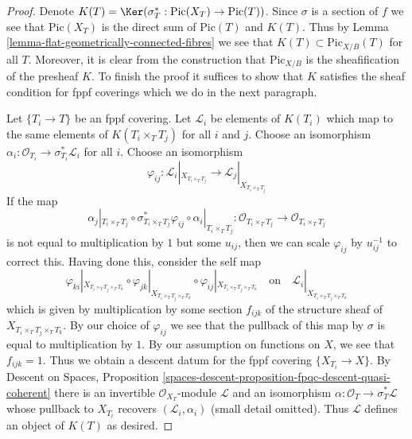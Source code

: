 \begin{proof}
Denote $K(T) = \Ker(\sigma_T^* : \text{Pic}(X_T) \to \text{Pic}(T))$.
Since $\sigma$ is a section of $f$ we see that $\text{Pic}(X_T)$ is the direct
sum of $\text{Pic}(T)$ and $K(T)$.
Thus by Lemma \ref{lemma-flat-geometrically-connected-fibres} we see that
$K(T) \subset \text{Pic}_{X/B}(T)$ for all $T$. Moreover, it is clear
from the construction that $\text{Pic}_{X/B}$ is the sheafification
of the presheaf $K$. To finish the proof it suffices to show that
$K$ satisfies the sheaf condition for fppf coverings which we do
in the next paragraph.

\medskip\noindent
Let $\{T_i \to T\}$ be an fppf covering. Let $\mathcal{L}_i$ be
elements of $K(T_i)$ which map to the same elements of $K(T_i \times_T T_j)$
for all $i$ and $j$. Choose an isomorphism
$\alpha_i : \mathcal{O}_{T_i} \to \sigma_{T_i}^*\mathcal{L}_i$
for all $i$. Choose an isomorphism
$$
\varphi_{ij} :
\mathcal{L}_i|_{X_{T_i \times_T T_j}}
\longrightarrow
\mathcal{L}_j|_{X_{T_i \times_T T_j}}
$$
If the map
$$
\alpha_j|_{T_i \times_T T_j} \circ
\sigma_{T_i \times_T T_j}^*\varphi_{ij} \circ
\alpha_i|_{T_i \times_T T_j} :
\mathcal{O}_{T_i \times_T T_j} \to \mathcal{O}_{T_i \times_T T_j}
$$
is not equal to multiplication by $1$ but some $u_{ij}$, then we can scale
$\varphi_{ij}$ by $u_{ij}^{-1}$ to correct this. Having done this, consider
the self map
$$
\varphi_{ki}|_{X_{T_i \times_T T_j \times_T T_k}} \circ
\varphi_{jk}|_{X_{T_i \times_T T_j \times_T T_k}} \circ
\varphi_{ij}|_{X_{T_i \times_T T_j \times_T T_k}}
\quad\text{on}\quad
\mathcal{L}_i|_{X_{T_i \times_T T_j \times_T T_k}}
$$
which is given by multiplication by some section $f_{ijk}$
of the structure sheaf of $X_{T_i \times_T T_j \times_T T_k}$.
By our choice of $\varphi_{ij}$ we see that the pullback of
this map by $\sigma$ is equal to multiplication by $1$. By
our assumption on functions on $X$, we see that $f_{ijk} = 1$.
Thus we obtain a descent datum for the fppf covering
$\{X_{T_i} \to X\}$. By
Descent on Spaces, Proposition
\ref{spaces-descent-proposition-fpqc-descent-quasi-coherent}
there is an invertible $\mathcal{O}_{X_T}$-module $\mathcal{L}$
and an isomorphism $\alpha : \mathcal{O}_T \to \sigma_T^*\mathcal{L}$
whose pullback to $X_{T_i}$ recovers $(\mathcal{L}_i, \alpha_i)$
(small detail omitted). Thus $\mathcal{L}$ defines an object
of $K(T)$ as desired.
\end{proof}


